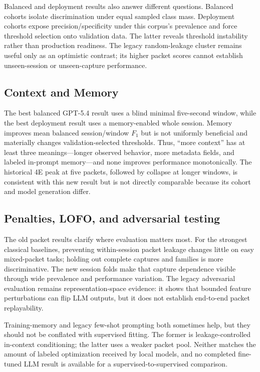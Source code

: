 \documentclass[letterpaper,twocolumn,10pt]{article}
\begin{document}
Balanced and deployment results also answer different questions. Balanced cohorts isolate discrimination under equal sampled class mass. Deployment cohorts expose precision/specificity under this corpus's prevalence and force threshold selection onto validation data. The latter reveals threshold instability rather than production readiness. The legacy random-leakage cluster remains useful only as an optimistic contrast; its higher packet scores cannot establish unseen-session or unseen-capture performance.

\subsection{Context and Memory}

The best balanced GPT-5.4 result uses a blind minimal five-second window, while the best deployment result uses a memory-enabled whole session. Memory improves mean balanced session/window $F_1$ but is not uniformly beneficial and materially changes validation-selected thresholds. Thus, ``more context'' has at least three meanings---longer observed behavior, more metadata fields, and labeled in-prompt memory---and none improves performance monotonically. The historical 4E peak at five packets, followed by collapse at longer windows, is consistent with this new result but is not directly comparable because its cohort and model generation differ.

\subsection{Penalties, LOFO, and adversarial testing}

The old packet results clarify where evaluation matters most. For the strongest classical baselines, preventing within-session packet leakage changes little on easy mixed-packet tasks; holding out complete captures and families is more discriminative. The new session folds make that capture dependence visible through wide prevalence and performance variation. The legacy adversarial evaluation remains representation-space evidence: it shows that bounded feature perturbations can flip LLM outputs, but it does not establish end-to-end packet replayability.

Training-memory and legacy few-shot prompting both sometimes help, but they should not be conflated with supervised fitting. The former is leakage-controlled in-context conditioning; the latter uses a weaker packet pool. Neither matches the amount of labeled optimization received by local models, and no completed fine-tuned LLM result is available for a supervised-to-supervised comparison.
\end{document}
